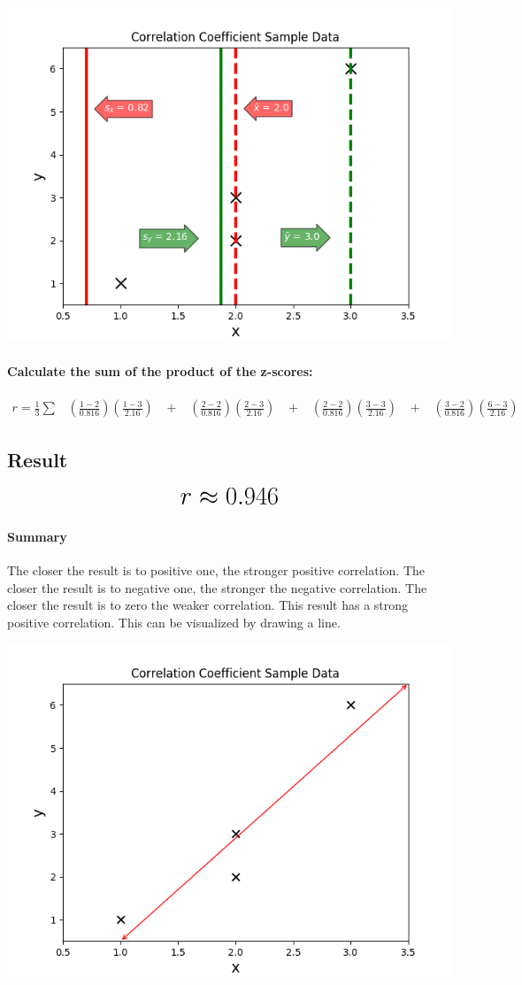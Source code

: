 \documentclass[12pt]{article}
\newcommand*{\mH}[1]{\mbox{\huge$#1$}}
\begin{document}
\includegraphics[scale=0.99]{correlation-coefficient-sample}
\paragraph{Calculate the sum of the product of the z-scores:}

\begin{equation}
\begin{gathered}
		r = \frac{1}{3}\sum \;\;\;%
		\left(\frac{1 - 2}{0.816}\right)\left(\frac{1 - 3}{2.16}\right) \;\;\;%
		+ \;\;\;%
		\left(\frac{2 - 2}{0.816}\right)\left(\frac{2 - 3}{2.16}\right) \;\;\;%
		+ \;\;\;%
		\left(\frac{2 - 2}{0.816}\right)\left(\frac{3 - 3}{2.16}\right) \;\;\;%
		+ \;\;\;%
		\left(\frac{3 - 2}{0.816}\right)\left(\frac{6 - 3}{2.16}\right) \;\;\;%
\end{gathered}%
\end{equation}%

\subsection*{Result}
\[\mH{r \approx 0.946}\]

\paragraph{Summary}
The closer the result is to positive one, the stronger positive correlation. The closer the result is to negative one, the stronger the negative correlation. The closer the result is to zero the weaker correlation. This result has a strong positive correlation. This can be visualized by drawing a line.

\includegraphics[scale=0.99]{correlation-coefficient-result}
\end{document}
